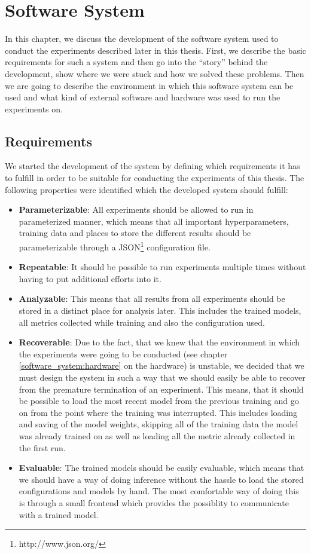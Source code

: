 \chapter{Software System}
\label{software_system}
In this chapter, we discuss the development of the software system used to conduct the experiments described later in this thesis. First, we describe the basic requirements for such a system and then go into the ``story'' behind the development, show where we were stuck and how we solved these problems. Then we are going to describe the environment in which this software system can be used and what kind of external software and hardware was used to run the experiments on.

\section{Requirements}
We started the development of the system by defining which requirements it has to fulfill in order to be suitable for conducting the experiments of this thesis. The following properties were identified which the developed system should fulfill:

\begin{itemize}
	\item \textbf{Parameterizable}: All experiments should be allowed to run in parameterized manner, which means that all important hyperparameters, training data and places to store the different results should be parameterizable through a JSON\footnote{http://www.json.org/} configuration file.
	\item \textbf{Repeatable}: It should be possible to run experiments multiple times without having to put additional efforts into it.
	\item \textbf{Analyzable}: This means that all results from all experiments should be stored in a distinct place for analysis later. This includes the trained models, all metrics collected while training and also the configuration used.
	\item \textbf{Recoverable}: Due to the fact, that we knew that the environment in which the experiments were going to be conducted (see chapter \ref{software_system:hardware} on the hardware) is unstable, we decided that we must design the system in such a way that we should easily be able to recover from the premature termination of an experiment. This means, that it should be possible to load the most recent model from the previous training and go on from the point where the training was interrupted. This includes loading and saving of the model weights, skipping all of the training data the model was already trained on as well as loading all the metric already collected in the first run.
	\item \textbf{Evaluable}: The trained models should be easily evaluable, which means that we should have a way of doing inference without the hassle to load the stored configurations and models by hand. The most comfortable way of doing this is through a small frontend which provides the possiblity to communicate with a trained model.
\end{itemize}

